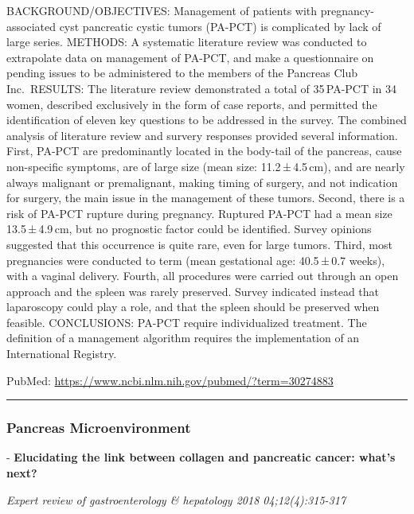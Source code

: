 \documentclass[]{article}
\begin{document}
BACKGROUND/OBJECTIVES: Management of patients with pregnancy-associated
cyst pancreatic cystic tumors (PA-PCT) is complicated by lack of large
series. METHODS: A systematic literature review was conducted to
extrapolate data on management of PA-PCT, and make a questionnaire on
pending issues to be administered to the members of the Pancreas Club
Inc.~RESULTS: The literature review demonstrated a total of 35\,PA-PCT
in 34 women, described exclusively in the form of case reports, and
permitted the identification of eleven key questions to be addressed in
the survey. The combined analysis of literature review and survery
responses provided several information. First, PA-PCT are predominantly
located in the body-tail of the pancreas, cause non-specific symptoms,
are of large size (mean size: 11.2\,±\,4.5\,cm), and are nearly always
malignant or premalignant, making timing of surgery, and not indication
for surgery, the main issue in the management of these tumors. Second,
there is a risk of PA-PCT rupture during pregnancy. Ruptured PA-PCT had
a mean size 13.5\,±\,4.9\,cm, but no prognostic factor could be
identified. Survey opinions suggested that this occurrence is quite
rare, even for large tumors. Third, most pregnancies were conducted to
term (mean gestational age: 40.5\,±\,0.7 weeks), with a vaginal
delivery. Fourth, all procedures were carried out through an open
approach and the spleen was rarely preserved. Survey indicated instead
that laparoscopy could play a role, and that the spleen should be
preserved when feasible. CONCLUSIONS: PA-PCT require individualized
treatment. The definition of a management algorithm requires the
implementation of an International Registry.

PubMed: \url{https://www.ncbi.nlm.nih.gov/pubmed/?term=30274883}

{}

{}

\begin{center}\rule{0.5\linewidth}{\linethickness}\end{center}

\hypertarget{pancreas-microenvironment}{%
\subsubsection{Pancreas
Microenvironment}\label{pancreas-microenvironment}}

 - \textbf{Elucidating the link between collagen and pancreatic cancer:
what's next?}

\emph{Expert review of gastroenterology \& hepatology 2018
04;12(4):315-317}
\end{document}
